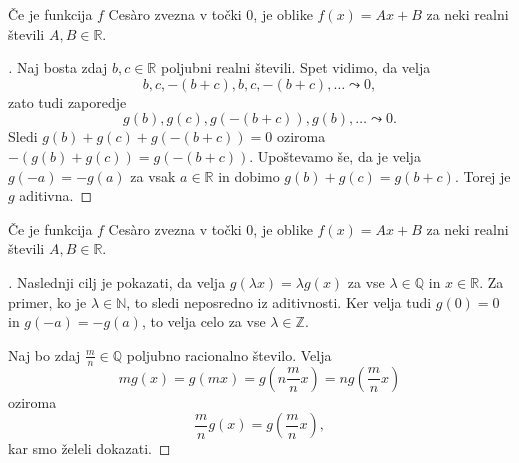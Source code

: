 \documentclass[10pt,hyperref={unicode}]{beamer}
\newenvironment{dokaz}{\begin{proof}[\bfseries\upshape\proofname]}{\end{proof}}
\begin{document}
\begin{frame}
    \begin{block}{}
        Če je funkcija $f$ Ces\`{a}ro zvezna v točki $0$, je oblike $f(x) = Ax + B$ za neki realni števili $A, B \in \mathbb{R}$.
    \end{block}
    \begin{dokaz}\renewcommand{\qedsymbol}{}
        Naj bosta zdaj $b, c \in \mathbb{R}$ poljubni realni števili. Spet vidimo, da velja 
        $$b, c, -(b+c), b, c, -(b+c), \ldots \leadsto 0,$$ zato tudi zaporedje $$g(b), g(c), g(-(b+c)), g(b), \ldots \leadsto 0.$$
        \pause
        Sledi $g(b) + g(c) + g(-(b+c)) = 0$ oziroma $-(g(b) + g(c)) = g(-(b+c))$. 
        \pause 
        Upoštevamo še, da je velja $g(-a) = -g(a)$ za vsak $a \in \mathbb{R}$ in dobimo $g(b) + g(c) = g(b+c)$. Torej je $g$ aditivna.
    \end{dokaz}
\end{frame}

\begin{frame}
    \begin{block}{}
        Če je funkcija $f$ Ces\`{a}ro zvezna v točki $0$, je oblike $f(x) = Ax + B$ za neki realni števili $A, B \in \mathbb{R}$.
    \end{block}
    \begin{dokaz}\renewcommand{\qedsymbol}{}
        Naslednji cilj je pokazati, da velja $g(\lambda x) = \lambda g(x)$ za vse $\lambda \in \mathbb{Q}$ in $x \in \mathbb{R}$. Za primer, ko je $\lambda \in \mathbb{N}$, to sledi neposredno iz aditivnosti. Ker velja tudi $g(0) = 0$ in $g(-a) = -g(a)$, to velja celo za vse $\lambda \in \mathbb{Z}$. 
        \pause

        Naj bo zdaj $\frac{m}{n} \in \mathbb{Q}$ poljubno racionalno število. Velja 
        $$mg(x) = g(mx) = g\left( n\frac{m}{n}x \right) = ng\left(\frac{m}{n}x\right)$$ 
        oziroma 
        $$\frac{m}{n}g(x) = g \left(\frac{m}{n}x \right),$$ 
        kar smo želeli dokazati.
    \end{dokaz}
\end{frame}
\end{document}
